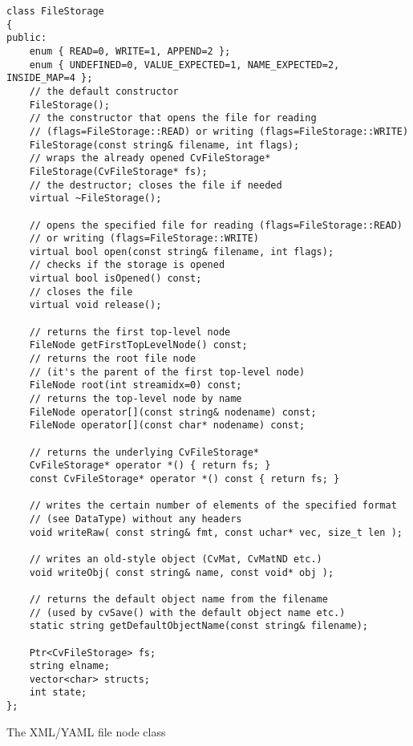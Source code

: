 \begin{lstlisting}
class FileStorage
{
public:
    enum { READ=0, WRITE=1, APPEND=2 };
    enum { UNDEFINED=0, VALUE_EXPECTED=1, NAME_EXPECTED=2, INSIDE_MAP=4 };
    // the default constructor
    FileStorage();
    // the constructor that opens the file for reading
    // (flags=FileStorage::READ) or writing (flags=FileStorage::WRITE)
    FileStorage(const string& filename, int flags);
    // wraps the already opened CvFileStorage*
    FileStorage(CvFileStorage* fs);
    // the destructor; closes the file if needed
    virtual ~FileStorage();

    // opens the specified file for reading (flags=FileStorage::READ)
    // or writing (flags=FileStorage::WRITE)
    virtual bool open(const string& filename, int flags);
    // checks if the storage is opened
    virtual bool isOpened() const;
    // closes the file
    virtual void release();

    // returns the first top-level node
    FileNode getFirstTopLevelNode() const;
    // returns the root file node
    // (it's the parent of the first top-level node)
    FileNode root(int streamidx=0) const;
    // returns the top-level node by name
    FileNode operator[](const string& nodename) const;
    FileNode operator[](const char* nodename) const;

    // returns the underlying CvFileStorage*
    CvFileStorage* operator *() { return fs; }
    const CvFileStorage* operator *() const { return fs; }
    
    // writes the certain number of elements of the specified format
    // (see DataType) without any headers
    void writeRaw( const string& fmt, const uchar* vec, size_t len );
    
    // writes an old-style object (CvMat, CvMatND etc.)
    void writeObj( const string& name, const void* obj );

    // returns the default object name from the filename
    // (used by cvSave() with the default object name etc.)
    static string getDefaultObjectName(const string& filename);

    Ptr<CvFileStorage> fs;
    string elname;
    vector<char> structs;
    int state;
};
\end{lstlisting}


The XML/YAML file node class

